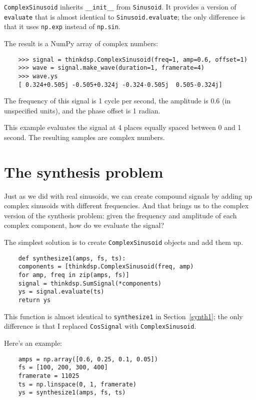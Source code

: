 {\tt ComplexSinusoid} inherits \verb"__init__" from
{\tt Sinusoid}.  It provides a version of {\tt evaluate}
that is almost identical to {\tt Sinusoid.evaluate}; the
only difference is that it uses {\tt np.exp} instead of
{\tt np.sin}.

The result is a NumPy array of complex numbers:

\begin{verbatim}
	>>> signal = thinkdsp.ComplexSinusoid(freq=1, amp=0.6, offset=1)
	>>> wave = signal.make_wave(duration=1, framerate=4)
	>>> wave.ys
	[ 0.324+0.505j -0.505+0.324j -0.324-0.505j  0.505-0.324j]
\end{verbatim}

The frequency of this signal is 1 cycle per second, the amplitude
is 0.6 (in unspecified units), and the phase offset is 1 radian.

This example evaluates the signal at 4 places equally spaced between
0 and 1 second.  The resulting samples are complex numbers.


\section{The synthesis problem}

Just as we did with real sinusoids, we can create compound signals
by adding up complex sinusoids with different frequencies.  And that
brings us to the complex version of the synthesis problem: given the
frequency and amplitude of each complex component, how do we evaluate the
signal?

The simplest solution is to create {\tt ComplexSinusoid} objects and
add them up.

\begin{verbatim}
	def synthesize1(amps, fs, ts):
	components = [thinkdsp.ComplexSinusoid(freq, amp)
	for amp, freq in zip(amps, fs)]
	signal = thinkdsp.SumSignal(*components)
	ys = signal.evaluate(ts)
	return ys
\end{verbatim}

This function is almost identical to {\tt synthesize1} in
Section~\ref{synth1}; the only difference is that I replaced
{\tt CosSignal} with {\tt ComplexSinusoid}.

Here's an example:

\begin{verbatim}
	amps = np.array([0.6, 0.25, 0.1, 0.05])
	fs = [100, 200, 300, 400]
	framerate = 11025
	ts = np.linspace(0, 1, framerate)
	ys = synthesize1(amps, fs, ts)
\end{verbatim}


